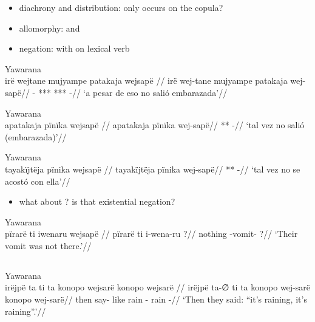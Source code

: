 \documentclass{memoir}
\begin{document}
\begin{itemize}
\tightlist
\item
  diachrony and distribution: only occurs on the copula?
\item
  allomorphy:  and 
\item
  negation: with  on lexical verb
\end{itemize}

\ex Yawarana \\
\label{ctoaragrme-38}    \begingl
    \glpreamble  irë wejtane mujyampe patakaja wejsapë //
    \gla irë wej-tane mujyampe patakaja wej-sapë//
    \glb {} - *** *** -//
        \glft ‘a pesar de eso no salió embarazada’//  
    \endgl 
\xe

\ex Yawarana \\
\label{ctoaragrme-39}    \begingl
    \glpreamble  apatakaja pïnïka wejsapë //
    \gla apatakaja pïnïka wej-sapë//
    \glb ***  -//
        \glft ‘tal vez no salió (embarazada)’//  
    \endgl 
\xe

\ex Yawarana \\
\label{ctoaragrme-40}    \begingl
    \glpreamble  tayakïjtëja pïnika wejsapë //
    \gla tayakïjtëja pïnika wej-sapë//
    \glb ***  -//
        \glft ‘tal vez no se acostó con ella’//  
    \endgl 
\xe

\begin{itemize}
\tightlist
\item
  what about ? is that existential negation?
\end{itemize}

\ex Yawarana \\
\label{ctorat-19}    \begingl
    \glpreamble  pïrarë ti iwenaru wejsapë //
    \gla pïrarë ti i-wena-ru ?//
    \glb nothing  -vomit- ?//
        \glft ‘Their vomit was not there.’//  
    \endgl 
\xe

\subsection{\texorpdfstring{}{}}

\ex Yawarana \\
\label{ctorat-25}    \begingl
    \glpreamble  irëjpë ta ti ta konopo wejsarë konopo wejsarë //
    \gla irëjpë ta-∅ ti ta konopo wej-sarë konopo wej-sarë//
    \glb then say-  like rain - rain -//
        \glft ‘Then they said: “it’s raining, it’s raining”.’//  
    \endgl 
\xe
\end{document}
